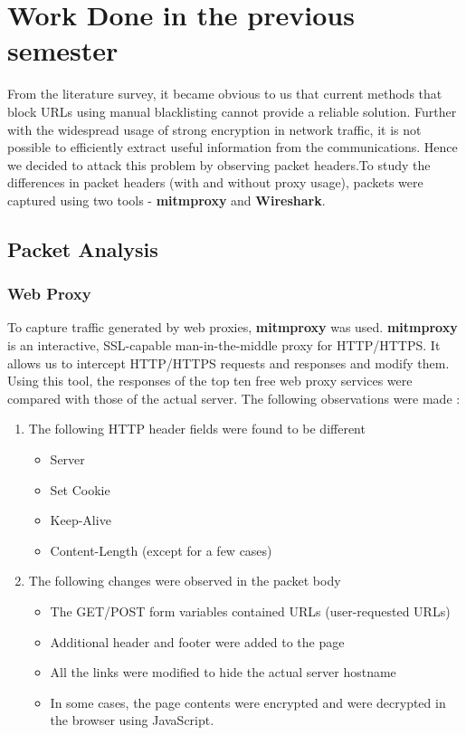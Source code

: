 \documentclass[a4paper,11pt,twocolumn]{article}
\begin{document}
\section{Work Done in the previous semester}
From the literature survey, it became obvious to us that current methods that block  URLs using manual blacklisting cannot provide a reliable solution. Further with the widespread usage of strong encryption in network traffic, it is not possible to efficiently extract useful information from the communications. Hence we decided to attack this problem by observing packet headers.To study the differences in packet headers (with and without proxy usage), packets were captured using two tools -\textbf{ mitmproxy} and \textbf{Wireshark}.

\subsection{Packet Analysis}

\subsubsection{Web Proxy}
To capture traffic generated by web proxies, \textbf{mitmproxy} was used.
\textbf{mitmproxy} is an interactive, SSL-capable man-in-the-middle proxy for HTTP/HTTPS. It allows us to intercept HTTP/HTTPS requests and responses and modify them. Using this tool, the responses of the top ten free web proxy services were compared with those of the actual server. The following observations were made :
\begin{enumerate}
\item The following HTTP header fields were found to be different
\begin{itemize}
\item Server
\item Set Cookie
\item Keep-Alive
\item Content-Length (except for a few cases)
\end{itemize}
\item The following changes were observed in the packet body
\begin{itemize}
\item The GET/POST form variables contained URLs (user-requested URLs)
\item Additional header and footer were added to the page
\item All the links were modified to hide the actual server hostname
\item In some cases, the page contents were encrypted and were decrypted in the browser using JavaScript.
\end{itemize}
\end{enumerate}
\end{document}
